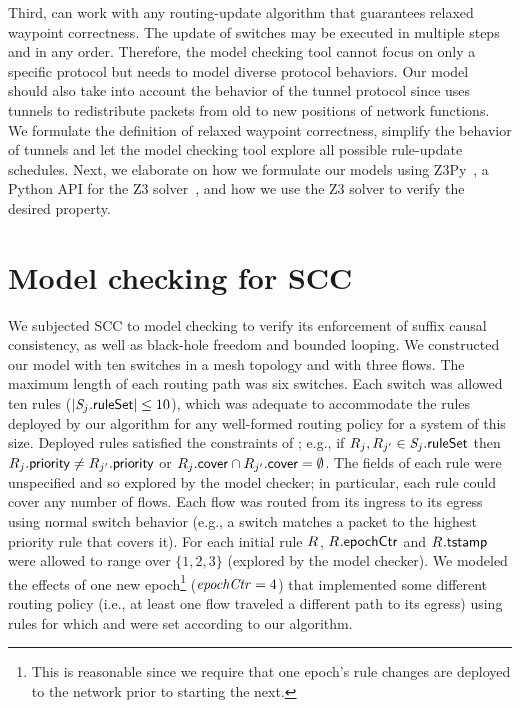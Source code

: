 Third, \sysname can work with any routing-update algorithm that guarantees relaxed waypoint correctness. The update of switches may be executed in multiple steps and in any order. Therefore, the model checking tool cannot focus on only a specific protocol but needs to model diverse protocol behaviors. Our model should also take into account the behavior of the tunnel protocol since \sysname uses tunnels to redistribute packets from old to new positions of network functions. We formulate the definition of relaxed waypoint correctness, simplify the behavior of tunnels and let the model checking tool explore all possible rule-update schedules. Next, we elaborate on how we formulate our models using Z3Py~\cite{z3py}, a Python API for the Z3 solver~\cite{Z3Solver}, and how we use the Z3 solver to verify the desired property. 





\section{Model checking for SCC}
We subjected SCC to
model checking to verify its enforcement of suffix causal
  consistency, as well as black-hole freedom and bounded looping.
We constructed our model with ten switches in a mesh topology and with
three flows. The maximum length of each routing path was six
  switches.  Each switch was allowed ten rules
($\setSize{\switchID{\switchIdx}{\ruleSet}} \le 10$), which was
  adequate to accommodate the rules deployed by our algorithm for any
  well-formed routing policy for a system of this size.  Deployed
rules satisfied the constraints of ; e.g., if
$\ruleID{\ruleIdx}, \ruleID{\ruleIdxAlt} \in
\switchID{\switchIdx}{\ruleSet}$ then
$\ruleID{\ruleIdx}{\priorityField} \neq
\ruleID{\ruleIdxAlt}{\priorityField}$ or
$\ruleID{\ruleIdx}{\coverField} \cap \ruleID{\ruleIdxAlt}{\coverField}
= \emptyset$.  The fields of each rule were unspecified and so
explored by the model checker; in particular, each rule could cover
any number of flows.  Each flow was routed from its ingress to its
egress using normal switch behavior (e.g., a switch matches a packet
to the highest priority rule that covers it).  For each initial
  rule $\ruleID{}$, $\ruleID{}{\epochField}$ and
  $\ruleID{}{\tagTmpField}$ were allowed to range over $\{1, 2, 3\}$
  (explored by the model checker). We modeled the effects of one new
  epoch\footnote{This is reasonable since we require that one epoch's
  rule changes are deployed to the network prior to starting the
  next.} ($\mathit{epochCtr} = 4$) that implemented some different routing
policy (i.e., at least one flow traveled a different
path to its egress) using rules for which  and
 were set according to our algorithm.

